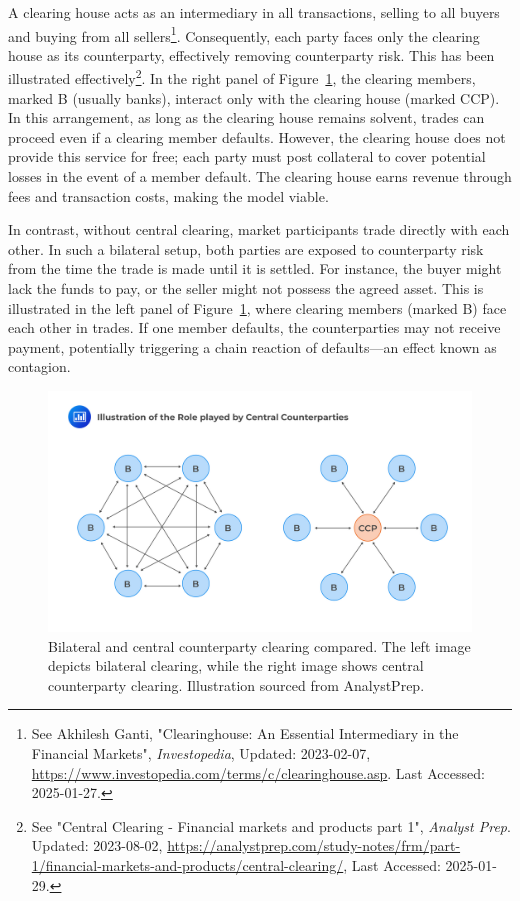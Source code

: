 A clearing house acts as an intermediary in all transactions, selling to all buyers and buying from all sellers\footnote{See Akhilesh Ganti, "Clearinghouse: An Essential Intermediary in the Financial Markets", \textit{Investopedia}, Updated: 2023-02-07, \url{https://www.investopedia.com/terms/c/clearinghouse.asp}. Last Accessed: 2025-01-27.}. Consequently, each party faces only the clearing house as its counterparty, effectively removing counterparty risk. This has been illustrated effectively\footnote{See "Central Clearing - Financial markets and products part 1", \textit{Analyst Prep}. Updated: 2023-08-02, \url{https://analystprep.com/study-notes/frm/part-1/financial-markets-and-products/central-clearing/}, Last Accessed: 2025-01-29.}. In the right panel of Figure~\ref{fig:CCP}, the clearing members, marked B (usually banks), interact only with the clearing house (marked CCP). In this arrangement, as long as the clearing house remains solvent, trades can proceed even if a clearing member defaults. However, the clearing house does not provide this service for free; each party must post collateral to cover potential losses in the event of a member default. The clearing house earns revenue through fees and transaction costs, making the model viable.

In contrast, without central clearing, market participants trade directly with each other. In such a bilateral setup, both parties are exposed to counterparty risk from the time the trade is made until it is settled. For instance, the buyer might lack the funds to pay, or the seller might not possess the agreed asset. This is illustrated in the left panel of Figure~\ref{fig:CCP}, where clearing members (marked B) face each other in trades. If one member defaults, the counterparties may not receive payment, potentially triggering a chain reaction of defaults—an effect known as contagion.

\begin{figure}[ht]
    \centering
    \includegraphics[width=0.7\linewidth]{1Introduction/pictures/CCPvisual .jpg}
    \caption{Bilateral and central counterparty clearing compared. The left image depicts bilateral clearing, while the right image shows central counterparty clearing. Illustration sourced from AnalystPrep\protect\footnotemark[\value{footnote}].}
    \label{fig:CCP}
\end{figure}

